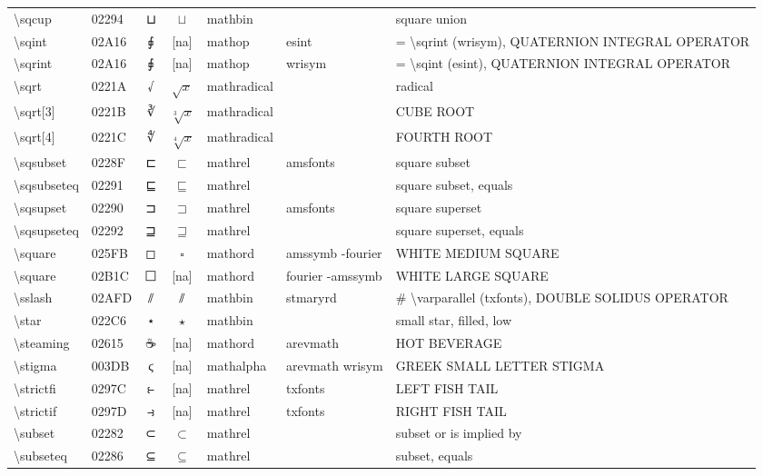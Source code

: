 \documentclass[a4paper,landscape]{article}
\begin{document}
\begin{longtable}{llcclll}
\textbackslash{}sqcup & 02294 & ⊔ & $\sqcup$ & mathbin &  & square union \\
\textbackslash{}sqint & 02A16 & ⨖ & [na] & mathop & esint & = \textbackslash{}sqrint (wrisym), QUATERNION INTEGRAL OPERATOR \\
\textbackslash{}sqrint & 02A16 & ⨖ & [na] & mathop & wrisym & = \textbackslash{}sqint (esint),  QUATERNION INTEGRAL OPERATOR \\
\textbackslash{}sqrt & 0221A & √ & $\sqrt{x}$ & mathradical &  & radical \\
\textbackslash{}sqrt[3] & 0221B & ∛ & $\sqrt[3]{x}$ & mathradical &  & CUBE ROOT \\
\textbackslash{}sqrt[4] & 0221C & ∜ & $\sqrt[4]{x}$ & mathradical &  & FOURTH ROOT \\
\textbackslash{}sqsubset & 0228F & ⊏ & $\sqsubset$ & mathrel & amsfonts & square subset \\
\textbackslash{}sqsubseteq & 02291 & ⊑ & $\sqsubseteq$ & mathrel &  & square subset, equals \\
\textbackslash{}sqsupset & 02290 & ⊐ & $\sqsupset$ & mathrel & amsfonts & square superset \\
\textbackslash{}sqsupseteq & 02292 & ⊒ & $\sqsupseteq$ & mathrel &  & square superset, equals \\
\textbackslash{}square & 025FB & ◻ & $\square$ & mathord & amssymb -fourier & WHITE MEDIUM SQUARE \\
\textbackslash{}square & 02B1C & ⬜ & [na] & mathord & fourier -amssymb & WHITE LARGE SQUARE \\
\textbackslash{}sslash & 02AFD & ⫽ & $\sslash$ & mathbin & stmaryrd & \# \textbackslash{}varparallel (txfonts), DOUBLE SOLIDUS OPERATOR \\
\textbackslash{}star & 022C6 & ⋆ & $\star$ & mathbin &  & small star, filled, low \\
\textbackslash{}steaming & 02615 & ☕ & [na] & mathord & arevmath & HOT BEVERAGE \\
\textbackslash{}stigma & 003DB & ϛ & [na] & mathalpha & arevmath wrisym & GREEK SMALL LETTER STIGMA \\
\textbackslash{}strictfi & 0297C & ⥼ & [na] & mathrel & txfonts & LEFT FISH TAIL \\
\textbackslash{}strictif & 0297D & ⥽ & [na] & mathrel & txfonts & RIGHT FISH TAIL \\
\textbackslash{}subset & 02282 & ⊂ & $\subset$ & mathrel &  & subset or is implied by \\
\textbackslash{}subseteq & 02286 & ⊆ & $\subseteq$ & mathrel &  & subset, equals \\

\end{longtable}
\end{document}
